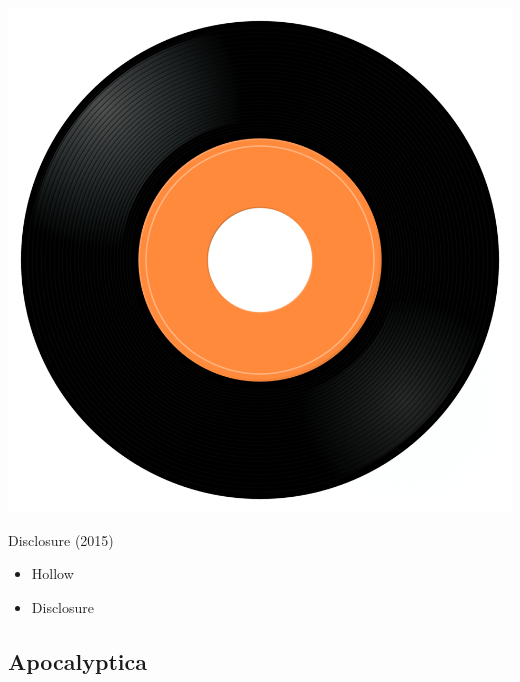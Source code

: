 \begin{minipage}[t]{0.25\textwidth}
\captionsetup{type=figure}
\includegraphics[width=\textwidth]{Images/cover.png}
\caption*{Disclosure (2015)}
\end{minipage}
\begin{minipage}[t]{0.25\textwidth}\vspace{0pt}
\begin{itemize}[nosep,leftmargin=1em,labelwidth=*,align=left]
	\setlength{\itemsep}{0pt}
	\item Hollow
	\item Disclosure
\end{itemize}
\end{minipage}

\subsection{Apocalyptica}

